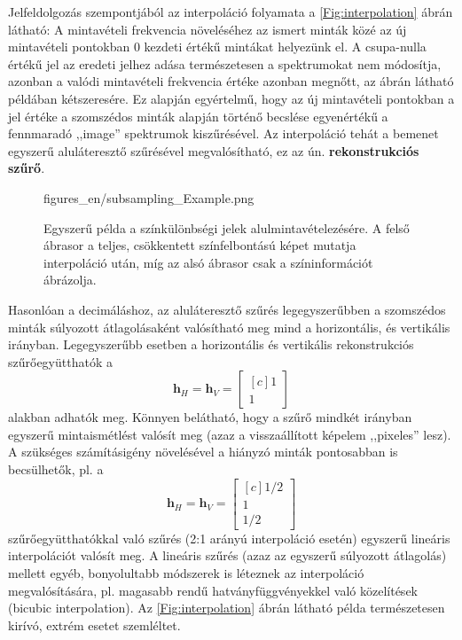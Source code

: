Jelfeldolgozás szempontjából az interpoláció folyamata a \ref{Fig:interpolation} ábrán látható:
A mintavételi frekvencia növeléséhez az ismert minták közé az új mintavételi pontokban 0 kezdeti értékű mintákat helyezünk el.
A csupa-nulla értékű jel az eredeti jelhez adása természetesen a spektrumokat nem módosítja, azonban a valódi mintavételi frekvencia értéke azonban megnőtt, az ábrán látható példában kétszeresére.
Ez alapján egyértelmű, hogy az új mintavételi pontokban a jel értéke a szomszédos minták alapján történő becslése egyenértékű a fennmaradó ,,image'' spektrumok kiszűrésével.
Az interpoláció tehát a bemenet egyszerű aluláteresztő szűrésével megvalósítható, ez az ún. \textbf{rekonstrukciós szűrő}.
\begin{figure}[t!]
	\centering
	\begin{overpic}[width = 0.8\columnwidth]{figures_en/subsampling_Example.png}
 	\end{overpic}
	\caption{Egyszerű példa a színkülönbségi jelek alulmintavételezésére.
	A felső ábrasor a teljes, csökkentett színfelbontású képet mutatja interpoláció után, míg az alsó ábrasor csak a színinformációt ábrázolja.}
	\label{Fig:chroma_subsampling_Ex}
\end{figure}

Hasonlóan a decimáláshoz, az aluláteresztő szűrés legegyszerűbben a szomszédos minták súlyozott átlagolásaként valósítható meg mind a horizontális, és vertikális irányban. 
Legegyszerűbb esetben a horizontális és vertikális rekonstrukciós szűrőegyütthatók a
\begin{equation}
\mathbf{h}_H =
\mathbf{h}_V =
\begin{bmatrix}[c]
       1 \\[0.3em]
       1\end{bmatrix}
\end{equation}
alakban adhatók meg.
Könnyen belátható, hogy a szűrő mindkét irányban egyszerű mintaismétlést valósít meg (azaz a visszaállított képelem ,,pixeles'' lesz).
A szükséges számításigény növelésével a hiányzó minták pontosabban is becsülhetők, pl. a 
\begin{equation}
\mathbf{h}_H =
\mathbf{h}_V =
\begin{bmatrix}[c]
       1/2 \\[0.3em]
       1 \\[0.3em]
       1/2 \end{bmatrix}
\end{equation}
szűrőegyütthatókkal való szűrés (2:1 arányú interpoláció esetén) egyszerű lineáris interpolációt valósít meg.
A lineáris szűrés (azaz az egyszerű súlyozott átlagolás) mellett egyéb, bonyolultabb módszerek is léteznek az interpoláció megvalósítására, pl. magasabb rendű hatványfüggvényekkel való közelítések (bicubic interpolation).
Az \ref{Fig:interpolation} ábrán látható példa természetesen kirívó, extrém esetet szemléltet.

